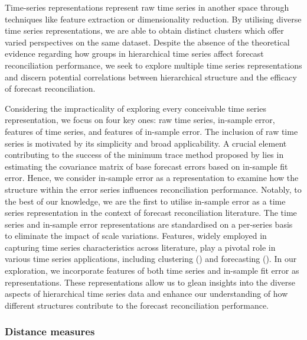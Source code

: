 \documentclass[a4paper,review,12pt,authoryear]{elsarticle}
\begin{document}
Time-series representations represent raw time series in another space through techniques like feature extraction or dimensionality reduction. By utilising diverse time series representations, we are able to obtain distinct clusters which offer varied perspectives on the same dataset. 
Despite the absence of the theoretical evidence regarding how groups in hierarchical time series affect forecast reconciliation performance, we seek to explore multiple time series representations and discern potential correlations between hierarchical structure and the efficacy of forecast reconciliation.

Considering the impracticality of exploring every conceivable time series representation, we focus on four key ones: raw time series, in-sample error, features of time series, and features of in-sample error.
The inclusion of raw time series is motivated by its simplicity and broad applicability.
A crucial element contributing to the success of the minimum trace method proposed by \cite{wickramasuriyaOptimalForecastReconciliation2019} lies in estimating the covariance matrix of base forecast errors based on in-sample fit error. Hence, we consider in-sample error as a representation to examine how the structure within the error series influences reconciliation performance. Notably, to the best of our knowledge, we are the first to utilise in-sample error as a time series representation in the context of forecast reconciliation literature.
The time series and in-sample error representations are standardised on a per-series basis to eliminate the impact of scale variations.
Features, widely employed in capturing time series characteristics across literature, play a pivotal role in various time series applications, including clustering (\citealp{tianoFeatTSFeaturebasedTime2021}) and forecasting (\citealp{wangUncertaintyEstimationFeaturebased2022, liFeaturebasedIntermittentDemand2023}). In our exploration, we incorporate features of both time series and in-sample fit error as representations. These representations allow us to glean insights into the diverse aspects of hierarchical time series data and enhance our understanding of how different structures contribute to the forecast reconciliation performance.


 


\subsubsection*{Distance measures}
\end{document}
